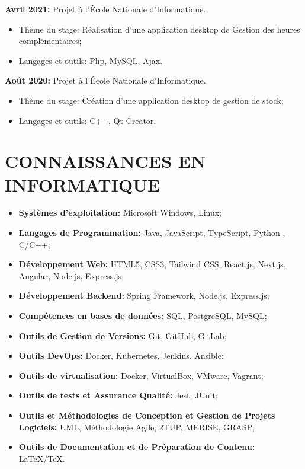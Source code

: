 \documentclass[12pt]{report}
\begin{document}
\begin{center}
\begin{minipage}{\textwidth}
\begin{itemize}
						\end{itemize} 
					\textbf{Avril 2021:} Projet à l’École Nationale d'Informatique.
						\begin{itemize}
							\item Thème du stage: Réalisation d’une application desktop de Gestion des heures complémentaires;
							\item Langages et outils: Php, MySQL, Ajax.								
						\end{itemize} 
					\textbf{Août 2020:} Projet à l’École Nationale d'Informatique.
						\begin{itemize}
							\item Thème du stage: Création d'une application desktop de gestion de stock;
							\item Langages et outils: C++, Qt Creator.								
						\end{itemize} 
   				\end{minipage}		
			\end{center}
			\section*{CONNAISSANCES EN INFORMATIQUE}
			\begin{center}
				\begin{minipage}{\textwidth}
					\begin{itemize}
						\item \textbf{Systèmes d'exploitation:} Microsoft Windows, Linux;
						\item \textbf{Langages de Programmation:} Java, JavaScript, TypeScript, Python , C/C++;
						\item \textbf{Développement Web:} HTML5, CSS3, Tailwind CSS, React.js, Next.js, Angular, Node.js, Express.js;
						\item \textbf{Développement Backend:} Spring Framework, Node.js, Express.js;
						\item \textbf{Compétences en bases de données:} SQL, PostgreSQL, MySQL;
						\item \textbf{Outils de Gestion de Versions:} Git, GitHub, GitLab; 	
						\item \textbf{Outils DevOps:} Docker, Kubernetes, Jenkins, Ansible;
						\item \textbf{Outils de virtualisation:} Docker, VirtualBox, VMware, Vagrant; 	
						\item \textbf{Outils de tests et Assurance Qualité:} Jest, JUnit;
						\item \textbf{Outils et Méthodologies de Conception et Gestion de Projets Logiciels:} UML, Méthodologie Agile, 2TUP, MERISE, GRASP;
						\item \textbf{Outils de Documentation et de Préparation de Contenu:} LaTeX/TeX.	
					\end{itemize}
	   			\end{minipage}		
			\end{center}
\end{document}
